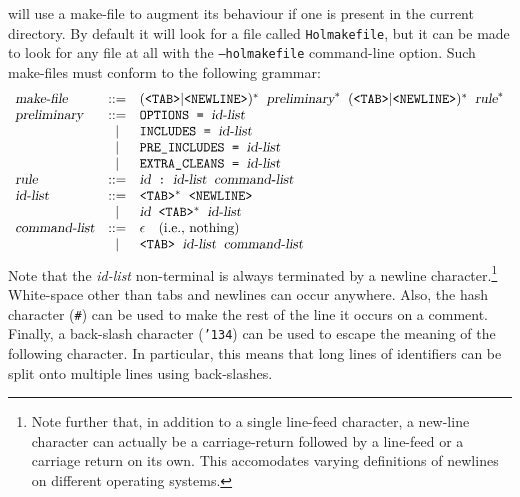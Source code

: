 \holmake{} will use a make-file to augment its behaviour if one is
present in the current directory.  By default it will look for a file
called \texttt{Holmakefile}, but it can be made to look for any file
at all with the \texttt{--holmakefile} command-line option.  Such
make-files must conform to the following grammar:
\newcommand\prelim{\textsl{preliminary}}
\newcommand\hmrule{\textsl{rule}}
\newcommand\id{\textsl{id}}
\newcommand\idlist{\textsl{id-list}}
\newcommand\commlist{\textsl{command-list}}
\newcommand\hmnewline{\texttt{<NEWLINE>}}
\newcommand\hmtab{\texttt{<TAB>}}
\[
\begin{array}{lcl}
\textsl{make-file}& ::= & (\hmtab|\hmnewline)^*\;\;\prelim^* \;\;
                          (\hmtab|\hmnewline)^*\;\;\hmrule^*\\
\prelim           & ::= & \texttt{OPTIONS}\;\; \texttt{=}\;\; \idlist\\
                  &  |  & \texttt{INCLUDES} \;\;\texttt{=}\;\; \idlist\\
                  &  |  & \texttt{PRE\_INCLUDES} \;\; \texttt{=}\;\;\idlist\\
                  &  |  & \texttt{EXTRA\_CLEANS} \;\; \texttt{=}\;\;\idlist\\
\hmrule           & ::= & \id\;\;\texttt{:}\;\;\idlist\;\;\commlist\\
\idlist           & ::= & \hmtab^* \;\; \hmnewline\\
                  &  |  & \id \;\; \hmtab^* \;\; \idlist\\
\commlist         & ::= & \epsilon \quad \mbox{(i.e., nothing)}\\
                  &  |  & \hmtab \;\; \idlist \;\; \commlist\\
\end{array}\]
Note that the \idlist{} non-terminal is always terminated by a newline
character.\footnote{Note further that, in addition to a single
  line-feed character, a new-line character can actually be a
  carriage-return followed by a line-feed or a carriage return on its
  own.  This accomodates varying definitions of newlines on different
  operating systems.}  White-space other than tabs and newlines can
occur anywhere.  Also, the hash character (\texttt{\#}) can be used to
make the rest of the line it occurs on a comment.  Finally, a
back-slash character (\texttt{\char'134}) can be used to escape the
meaning of the following character.  In particular, this means that
long lines of identifiers can be split onto multiple lines using
back-slashes.


